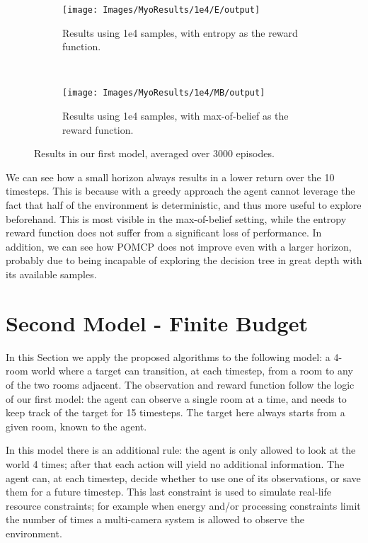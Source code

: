 \begin{figure}[ht!]
        \centering
        \begin{subfigure}[t]{0.45\textwidth}
                \texttt{[image: Images/MyoResults/1e4/E/output]}
                \caption{Results using 1e4 samples, with entropy as the reward function.}
                \label{fig:m4e}
        \end{subfigure}%
        ~ %
        \begin{subfigure}[t]{0.45\textwidth}
                \texttt{[image: Images/MyoResults/1e4/MB/output]}
                \caption{Results using 1e4 samples, with max-of-belief as the reward function.}
                \label{fig:m5e}
        \end{subfigure}
        \caption{Results in our first model, averaged over 3000 episodes.}
        \label{ref:myoentropyfig}
\end{figure}
We can see how a small horizon always results in a lower return over the 10 timesteps. This is
because with a greedy approach the agent cannot leverage the fact that half of the environment is
deterministic, and thus more useful to explore beforehand. This is most visible in the max-of-belief
setting, while the entropy reward function does not suffer from a significant loss of performance.
In addition, we can see how POMCP does not improve even with a larger horizon, probably due to being
incapable of exploring the decision tree in great depth with its available samples.

\section{Second Model - Finite Budget}
In this Section we apply the proposed algorithms to the following model: a 4-room world where a
target can transition, at each timestep, from a room to any of the two rooms adjacent. The
observation and reward function follow the logic of our first model: the agent can observe a single
room at a time, and needs to keep track of the target for 15 timesteps. The target here always
starts from a given room, known to the agent.

In this model there is an additional rule: the agent is only allowed to look at the world 4 times;
after that each action will yield no additional information. The agent can, at each timestep, decide
whether to use one of its observations, or save them for a future timestep. This last constraint is
used to simulate real-life resource constraints; for example when energy and/or processing
constraints limit the number of times a multi-camera system is allowed to observe the environment.

